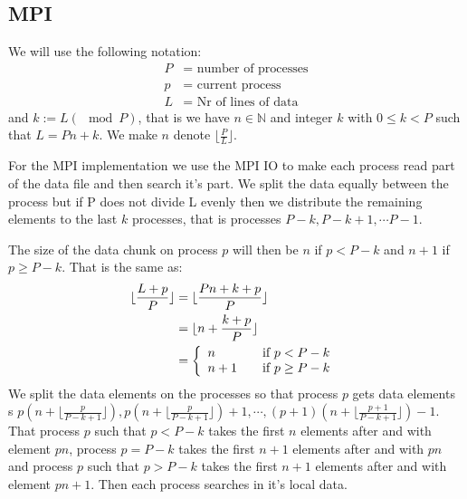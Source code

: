 \documentclass[a4paper,10pt]{article}
\begin{document}
\subsection{MPI}


  We will use the following notation:
  \begin{align*}
    P &= \text{ number of processes} \\
    p &= \text{ current process}  \\
    L &= \text{ Nr of lines of data } 
  \end{align*}
  and $k:= L (\mod P)$, that is we have $n\in \mathbb{N}$ and integer $k$ with $0\leq k < P$
  such that $L = Pn+k$.  We make $n$ denote $\lfloor \frac{P}{L} \rfloor$.

  For the MPI implementation we use the MPI IO to make each process read part of the data file
  and then search it's part.  We split the data equally between the process but if
  P does not divide L evenly then we distribute the remaining elements to the last $k$ processes,
  that is processes $P-k,P-k+1,\cdots P-1$.
  
  The size of the data chunk on process $p$ will then be $n$ if $p<P-k$ and $n+1$ if $p\geq P-k$.
  That is the same as:
  \begin{align*}
    \lfloor \frac{L+p}{P}\rfloor  &= \lfloor \frac{Pn+k+p}{P}\rfloor  \\
                                  &= \lfloor n+\frac{k+p}{P}\rfloor   \\
                                  &=                                  
                                  \left\{
                                    \begin{array}{l l}
                                       n   & \quad \text{if $p<P-k$ }\\
                                       n+1 & \quad \text{if $p\geq P-k$}\\
                                     \end{array} \right.
  \end{align*}
  We split the data elements on the processes so that process $p$ 
  gets data elements s
  $p\left( n + \lfloor \frac{p}{P-k+1} \rfloor \right),
   p\left( n + \lfloor \frac{p}{P-k+1} \rfloor \right)+1, \cdots,
   (p+1)\left( n + \lfloor \frac{p+1}{P-k+1} \rfloor \right)-1
  $.
  That process $p$ such that $p<P-k$ takes the first $n$ elements
  after and with element $ p n $, process $p=P-k$ takes the first
  $n+1$ elements after and with $ p n $
  and process $p$ such that $p>P-k$ takes the first $n+1$ elements after and
  with element $ p n +1 $.
  Then each process searches in it's local data.
\end{document}
